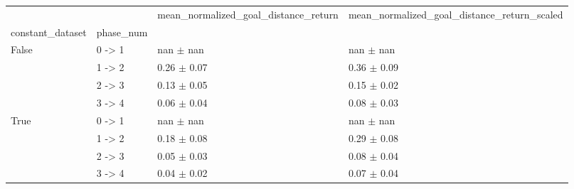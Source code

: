 \begin{tabular}{llll}
\toprule
 &  & mean_normalized_goal_distance_return & mean_normalized_goal_distance_return_scaled \\
constant_dataset & phase_num &  &  \\
\midrule
\multirow[t]{4}{*}{False} & 0 -> 1 & nan $\pm$ nan & nan $\pm$ nan \\
 & 1 -> 2 & 0.26 $\pm$ 0.07 & 0.36 $\pm$ 0.09 \\
 & 2 -> 3 & 0.13 $\pm$ 0.05 & 0.15 $\pm$ 0.02 \\
 & 3 -> 4 & 0.06 $\pm$ 0.04 & 0.08 $\pm$ 0.03 \\
\cline{1-4}
\multirow[t]{4}{*}{True} & 0 -> 1 & nan $\pm$ nan & nan $\pm$ nan \\
 & 1 -> 2 & 0.18 $\pm$ 0.08 & 0.29 $\pm$ 0.08 \\
 & 2 -> 3 & 0.05 $\pm$ 0.03 & 0.08 $\pm$ 0.04 \\
 & 3 -> 4 & 0.04 $\pm$ 0.02 & 0.07 $\pm$ 0.04 \\
\cline{1-4}
\bottomrule
\end{tabular}
